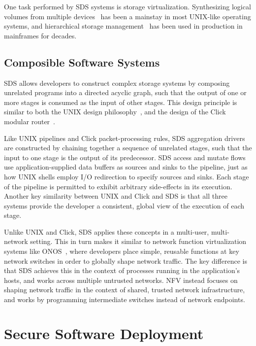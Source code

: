 One task performed by SDS systems is storage virtualization.  Synthesizing
logical volumes from multiple devices~\cite{lvm} has been a mainstay in most UNIX-like
operating systems, and hierarchical storage management~\cite{hsm} has been used
in production in mainframes for decades.

\subsection{Composible Software Systems}

SDS allows developers to construct complex storage systems by composing
unrelated programs into a directed acyclic graph, such that the output of one
or more stages is consumed as the input of other stages.  This design principle is
similar to both the UNIX design philosophy~\cite{unix-design-philosophy},
and the design of the Click modular router~\cite{click-modular-router}.

Like UNIX pipelines and Click packet-processing rules,
SDS aggregation drivers are constructed by chaining together a sequence of
unrelated stages, such that the input to one stage is the output of its
predecessor.  SDS access and mutate flows use application-supplied data buffers
as sources and sinks to the pipeline, just as how UNIX shells employ I/O
redirection to specify sources and sinks.  Each stage of the pipeline is
permitted to exhibit arbitrary side-effects in its execution.
Another key similarity between UNIX and Click and SDS is that all three systems
provide the developer a consistent, global view of the execution of each stage.

Unlike UNIX and Click, SDS applies these concepts in a multi-user, multi-network
setting.  This in turn makes it similar to network function virtualization
systems like ONOS~\cite{onos}, where developers
place simple, reusable functions at key network switches in order to
globally shape network traffic.  The key difference is that SDS achieves this
in the context of processes running in the application's hosts, and works across multiple untrusted
networks.  NFV instead focuses on shaping network traffic in the context of shared, trusted
network infrastructure, and works by programming intermediate switches instead
of network endpoints.

\section{Secure Software Deployment}

